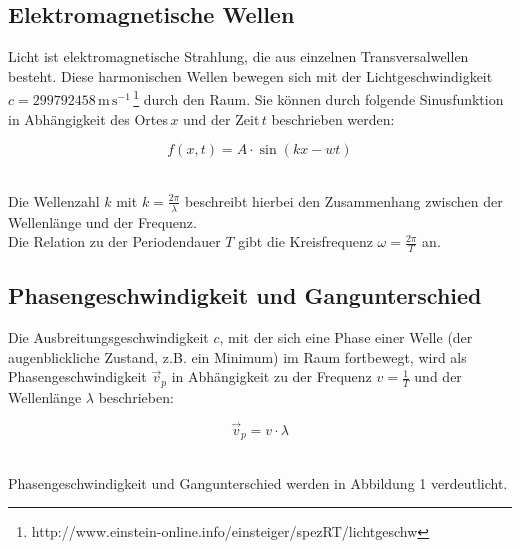 \documentclass[12pt,a4paper,titlepage,headinclude,bibtotoc]{scrartcl}
\begin{document}
\subsection{Elektromagnetische Wellen}
Licht ist elektromagnetische Strahlung, die aus einzelnen Transversalwellen besteht. Diese harmonischen Wellen bewegen sich mit der Lichtgeschwindigkeit 
 $c= 299 792 458\, \mathrm{m\,s^{-1}}$\,\footnote{http://www.einstein-online.info/einsteiger/spezRT/lichtgeschw} durch den Raum. Sie können durch folgende Sinusfunktion in Abhängigkeit des Ortes\,$x$ und der Zeit\,$t$ beschrieben werden:
\\
\par %
\begin{equation}
f(x,t)={ A}\cdot{\sin(kx-wt)}
\end{equation}
\\
\par

Die Wellenzahl $k$ mit $k=\frac{2\pi}{\lambda}$ beschreibt hierbei den Zusammenhang zwischen der Wellenlänge und der Frequenz. \\
Die Relation zu der Periodendauer $T$ gibt die Kreisfrequenz $\omega =\frac{2\pi}{T} $ an.  



\subsection{Phasengeschwindigkeit und Gangunterschied}
Die Ausbreitungsgeschwindigkeit $c$, mit der sich eine Phase einer Welle (der augenblickliche Zustand, z.B. ein Minimum) im Raum fortbewegt, wird als Phasengeschwindigkeit $\vec{v}_p$ in Abhängigkeit zu der Frequenz $v=\frac{1}{T}$ und der Wellenlänge $\lambda$ beschrieben:\\
\par
\begin{equation}
\vec{v}_p = {v}\cdot{\lambda}
\end{equation}
\\
\par

Phasengeschwindigkeit und Gangunterschied werden in Abbildung 1 verdeutlicht.
\end{document}
